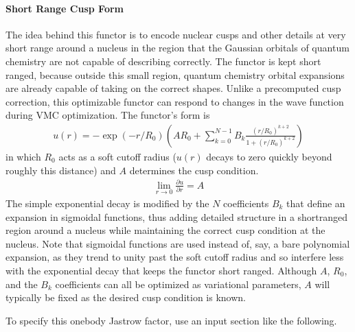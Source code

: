 \documentclass[letterpaper,10pt,english]{sphinxmanual}
\begin{document}
\paragraph{Short Range Cusp Form}
\label{\detokenize{intro_wavefunction:short-range-cusp-form}}
The idea behind this functor is to encode nuclear cusps and other details at very
short range around a nucleus in the region that the Gaussian orbitals of quantum
chemistry are not capable of describing correctly.
The functor is kept short ranged, because outside this small region, quantum chemistry
orbital expansions are already capable of taking on the correct shapes.
Unlike a pre\sphinxhyphen{}computed cusp correction, this optimizable functor can respond to
changes in the wave function during VMC optimization.
The functor’s form is
\begin{equation}\label{equation:intro_wavefunction:eq12}
\begin{split}u(r) = -\exp{\left(-r/R_0\right)} \left( A R_0 + \sum_{k=0}^{N-1} B_k \frac{ (r/R_0)^{k+2} }{ 1 + (r/R_0)^{k+2} } \right)\end{split}
\end{equation}
in which \(R_0\) acts as a soft cutoff radius (\(u(r)\) decays to zero quickly beyond roughly this distance)
and \(A\) determines the cusp condition.
\begin{equation}\label{equation:intro_wavefunction:eq13}
\begin{split}\lim_{r \to 0} \frac{\partial u}{\partial r} = A\end{split}
\end{equation}
The simple exponential decay is modified by the \(N\) coefficients
\(B_k\) that define an expansion in sigmoidal functions, thus adding
detailed structure in a short\sphinxhyphen{}ranged region around a nucleus while
maintaining the correct cusp condition at the nucleus. Note that
sigmoidal functions are used instead of, say, a bare polynomial
expansion, as they trend to unity past the soft cutoff radius and so
interfere less with the exponential decay that keeps the functor short
ranged. Although \(A\), \(R_0\), and the \(B_k\)
coefficients can all be optimized as variational parameters, \(A\)
will typically be fixed as the desired cusp condition is known.

To specify this one\sphinxhyphen{}body Jastrow factor, use an input section like the following.
\end{document}

